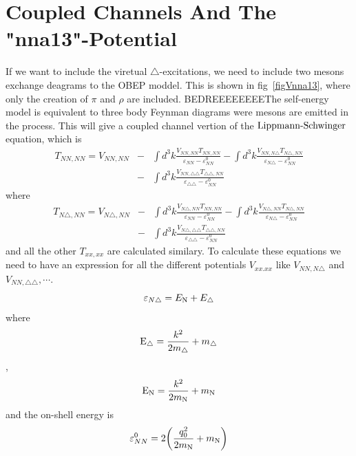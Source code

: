 \section{Coupled Channels And The "nna13"-Potential}
If we want to include the viretual $\triangle$-excitations, we need
to include two mesons exchange deagrams to the OBEP moddel. This is shown in
fig~\ref{figVnna13}, where only the creation of $\pi$ and $\rho$ are included.
BEDREEEEEEEEThe self-energy model is
equivalent to three body Feynman diagrams were mesons are emitted in the process.
This will give a coupled
channel vertion of the $\text{Lippmann-Schwinger}$ equation, which is
\begin{eqnarray}
{T}_{NN,NN}=V_{NN,NN}&-&\int d^3k\frac{V_{NN,NN}{T}_{NN,NN}}{\varepsilon_{NN}-\varepsilon^0_{NN}}
-\int d^3k\frac{V_{NN,N\triangle}{T}_{N\triangle,NN}}{\varepsilon_{N\triangle}-\varepsilon^0_{NN}}\nonumber\\
&-&\int d^3k\frac{V_{NN,\triangle\triangle}{T}_{\triangle\triangle,NN}}{\varepsilon_{\triangle\triangle}-\varepsilon^0_{NN}} 
\end{eqnarray}
where  
\begin{eqnarray}
{T}_{N\triangle,NN}=V_{N\triangle,NN}&-&\int d^3k\frac{V_{N\triangle,NN}{T}_{NN,NN}}{\varepsilon_{NN}-\varepsilon^0_{NN}}
-\int d^3k\frac{V_{N\triangle,NN}{T}_{N\triangle,NN}}{\varepsilon_{N\triangle}-\varepsilon^0_{NN}}\nonumber\\
&-&\int d^3k\frac{V_{N\triangle,\triangle\triangle}{T}_{\triangle\triangle,NN}}{\varepsilon_{\triangle\triangle}-\varepsilon^0_{NN}}
\end{eqnarray}
and all the other ${T}_{xx,xx}$ are calculated similary. To calculate these equations we need to have an expression for
all the different potentials $V_{xx.xx}$ like $V_{NN,N\triangle}$ and $V_{NN,\triangle\triangle},\cdots$. 
\begin{equation}
\varepsilon_{N\triangle}=E_{{\text N}}+E_\triangle
\end{equation}
where
\begin{equation}
{{\text E}}_{{\triangle}} =\frac{k^2}{2m_{{\triangle}}}+m_{{\triangle}}
\end{equation}
,
\begin{equation}
{{\text E}}_{{\text N}} =\frac{k^2}{2m_{{\text N}}}+m_{{\text N}}
\end{equation}
and the on-shell energy is
\begin{equation}
\varepsilon^0_{NN}=2\bigg(\frac{q^2_0}{2m_{{\text N}}}+m_{{\text N}}\bigg)
\end{equation}

